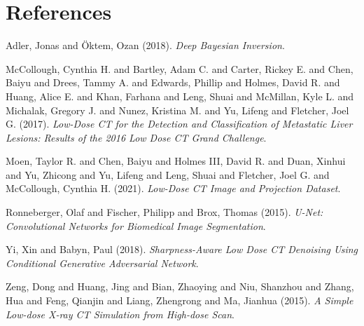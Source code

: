 \documentclass[a4paper, 11pt]{article}
\begin{document}
\section{References}
\label{sec:org22f4503}
\noindent
Adler, Jonas and Öktem, Ozan (2018). \emph{Deep {{Bayesian Inversion}}}.

\noindent
McCollough, Cynthia H. and Bartley, Adam C. and Carter, Rickey E. and Chen, Baiyu and Drees, Tammy A. and Edwards, Phillip and Holmes, David R. and Huang, Alice E. and Khan, Farhana and Leng, Shuai and McMillan, Kyle L. and Michalak, Gregory J. and Nunez, Kristina M. and Yu, Lifeng and Fletcher, Joel G. (2017). \emph{Low-Dose {{CT}} for the Detection and Classification of Metastatic Liver Lesions: {{Results}} of the 2016 {{Low Dose CT Grand Challenge}}}.

\noindent
Moen, Taylor R. and Chen, Baiyu and Holmes III, David R. and Duan, Xinhui and Yu, Zhicong and Yu, Lifeng and Leng, Shuai and Fletcher, Joel G. and McCollough, Cynthia H. (2021). \emph{Low-Dose {{CT}} Image and Projection Dataset}.

\noindent
Ronneberger, Olaf and Fischer, Philipp and Brox, Thomas (2015). \emph{U-{{Net}}: {{Convolutional Networks}} for {{Biomedical Image Segmentation}}}.

\noindent
Yi, Xin and Babyn, Paul (2018). \emph{Sharpness-Aware {{Low}} Dose {{CT}} Denoising Using Conditional Generative Adversarial Network}.

\noindent
Zeng, Dong and Huang, Jing and Bian, Zhaoying and Niu, Shanzhou and Zhang, Hua and Feng, Qianjin and Liang, Zhengrong and Ma, Jianhua (2015). \emph{A {{Simple Low-dose X-ray CT Simulation}} from {{High-dose Scan}}}.
\end{document}
